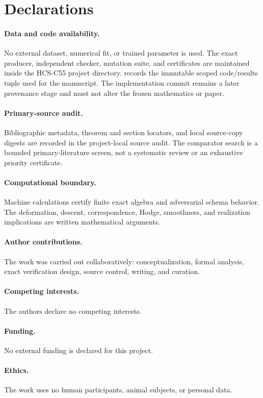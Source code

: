 \section{Declarations}
\label{sec:declarations}

\paragraph{Data and code availability.}
No external dataset, numerical fit, or trained parameter is used.  The
exact producer, independent checker, mutation suite, and certificates are
maintained inside the HCS-C55 project directory.
 records the immutable scoped code/results tuple used
for the manuscript.  The implementation commit remains a later provenance
stage and must not alter the frozen mathematics or paper.

\paragraph{Primary-source audit.}
Bibliographic metadata, theorem and section locators, and local source-copy
digests are recorded in the project-local source audit.  The comparator
search is a bounded primary-literature screen, not a systematic review or
an exhaustive priority certificate.

\paragraph{Computational boundary.}
Machine calculations certify finite exact algebra and adversarial schema
behavior.  The deformation, descent, correspondence, Hodge, smoothness, and
realization implications are written mathematical arguments.

\paragraph{Author contributions.}
The work was carried out collaboratively: conceptualization, formal
analysis, exact verification design, source control, writing, and curation.

\paragraph{Competing interests.}
The authors declare no competing interests.

\paragraph{Funding.}
No external funding is declared for this project.

\paragraph{Ethics.}
The work uses no human participants, animal subjects, or personal data.
